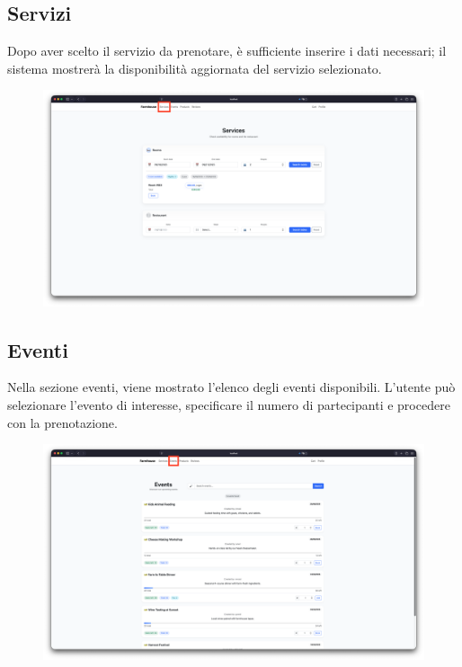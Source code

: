 \documentclass[a4paper,12pt]{report}
\begin{document}
\subsection*{Servizi}
Dopo aver scelto il servizio da prenotare, è sufficiente inserire i dati necessari; il sistema 
mostrerà la disponibilità aggiornata del servizio selezionato.

\begin{figure}[H]
    \centering
    \includegraphics[width=\textwidth, trim=0 0 0 0]{./img/users/services.png}
    \vspace{-1em}
    \label{fig:services}
\end{figure}

\subsection*{Eventi}
Nella sezione eventi, viene mostrato l'elenco degli eventi disponibili. L'utente può selezionare 
l'evento di interesse, specificare il numero di partecipanti e procedere con la prenotazione. 

\begin{figure}[H]
    \centering
    \includegraphics[width=\textwidth, trim=0 0 0 0]{./img/users/events.png}
    \vspace{-1em}
    \label{fig:events}
\end{figure}
\end{document}
